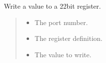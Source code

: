 \documentclass[letterpaper,10pt,english]{sphinxmanual}
\begin{document}
\begin{fulllineitems}
\label{\detokenize{cplddocs:phy_marvell_88X2222_init.write22_reg}}
\pysigstartsignatures
{}
\pysigstopsignatures
\sphinxAtStartPar
Write a value to a 22\sphinxhyphen{}bit register.
\begin{quote}\begin{description}
\begin{itemize}
\item {} 
\sphinxAtStartPar
{} \textendash{} The port number.

\item {} 
\sphinxAtStartPar
{} \textendash{} The register definition.

\item {} 
\sphinxAtStartPar
{} \textendash{} The value to write.

\end{itemize}

\end{description}\end{quote}

\end{fulllineitems}

\end{document}
